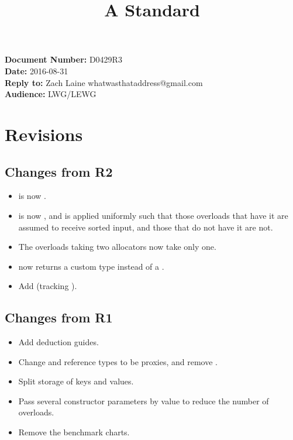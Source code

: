 \documentclass{article}
\begin{document}
\title{\textbf{\Large A Standard }}
\date{}
{\let\newpage\relax\maketitle}

\noindent\textbf{Document Number:} D0429R3\\
\textbf{Date:} 2016-08-31\\
\textbf{Reply to:} Zach Laine whatwasthataddress@gmail.com\\
\textbf{Audience:} LWG/LEWG

\section{Revisions}

\label{sec:revisions}

\subsection{Changes from R2}

\begin{itemize}
  \item {} is now .
  \item {} is now , and
    is applied uniformly such that those overloads that have it are assumed to
    receive sorted input, and those that do not have it are not.
  \item The overloads taking two allocators now take only one.
  \item {} now returns a custom type instead of a .
  \item Add  (tracking ).
\end{itemize}

\subsection{Changes from R1}

\begin{itemize}
  \item Add deduction guides.
  \item Change  and reference types to be proxies, and remove
    .
  \item Split storage of keys and values.
  \item Pass several constructor parameters by value to reduce the number of overloads.
  \item Remove the benchmark charts.
\end{itemize}
\end{document}
